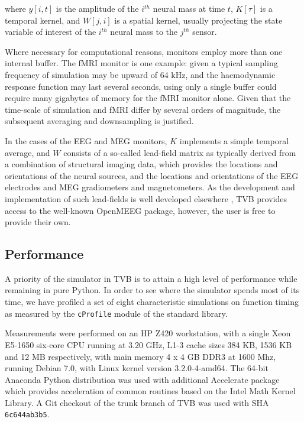 \documentclass{bioinfo}
\begin{document}
	\noindent where $y[i, t]$ is the amplitude of the $i^{th}$ neural mass at time
	$t$, $K[\tau]$ is a temporal kernel, and $W[j, i]$ is a spatial kernel,
	usually projecting the state variable of interest of the $i^{th}$ 
	neural mass to the $j^{th}$ sensor. 

	Where necessary for computational reasons, monitors employ more than 
	one internal buffer. The fMRI monitor is one 
	example: given a typical sampling frequency of simulation may be upward of 
	64 kHz, and the haemodynamic response function may last several seconds, 
	using only a single buffer could require many gigabytes of memory for the 
	fMRI monitor alone. Given that 
	the time-scale of simulation and fMRI differ by several orders of magnitude, 
	the subsequent averaging and downsampling is justified. 

	In the cases of the EEG and MEG monitors, $K$ implements a simple
	temporal average, and $W$ consists of a so-called lead-field matrix as typically
	derived from a combination of structural imaging data, 
	which provides the locations and orientations of the neural sources, and the locations
	and orientations of the EEG electrodes and MEG gradiometers and magnetometers. 
	As the development and implementation of such lead-fields is well developed
	elsewhere \citep{Sarvas_1987,Hamalainen_1989,Jirsa_2002,Nolte2003,Gramfort_2010}, TVB provides access
	to the well-known OpenMEEG package, however, the user is free to provide 
	their own.

\subsection{Performance}

	A priority of the simulator in TVB is to attain a high level of performance
	while remaining in pure Python. In order to see where the simulator 
	spends most of its time, we have profiled 
	a set of eight characteristic simulations
    	on function timing as measured by the 
	\texttt{cProfile} module of the standard library. 
	
	Measurements were
	performed on an HP Z420 workstation, with a single Xeon E5-1650
	six-core CPU running at 3.20 GHz, L1-3 cache sizes 384 KB, 1536 KB
	and 12 MB respectively, with main memory 4 x 4 GB DDR3 at 1600 Mhz,
	running Debian 7.0, with Linux kernel version 3.2.0-4-amd64. 
	The 64-bit Anaconda Python distribution was used with additional Accelerate
	package which provides acceleration of common routines based on the 
	Intel Math Kernel Library. A Git checkout of the trunk branch of TVB 
	was used with SHA \texttt{6c644ab3b5}.
\end{document}

